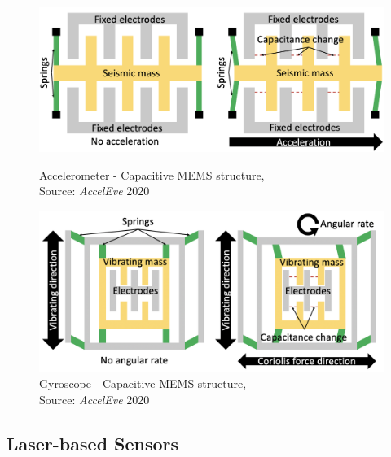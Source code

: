 \documentclass[sigconf, nonacm]{acmart}
\begin{document}
\begin{figure}[H]
  \centering
  \includegraphics[width=\linewidth]{embed/MEMS_accelerometer.png}
  \caption{Accelerometer - Capacitive MEMS structure, \\Source: \textit{AccelEve} 2020 \cite{AccelEve2020}}
  \label{fig:MEMS_accelerometer}

  \vspace{0.25cm}

  \includegraphics[width=\linewidth]{embed/MEMS_gyroscope.png}
  \caption{Gyroscope - Capacitive MEMS structure, \\Source: \textit{AccelEve} 2020 \cite{AccelEve2020}}
  \label{fig:MEMS_gyroscope}
\end{figure}

\subsection{Laser-based Sensors}
\end{document}
